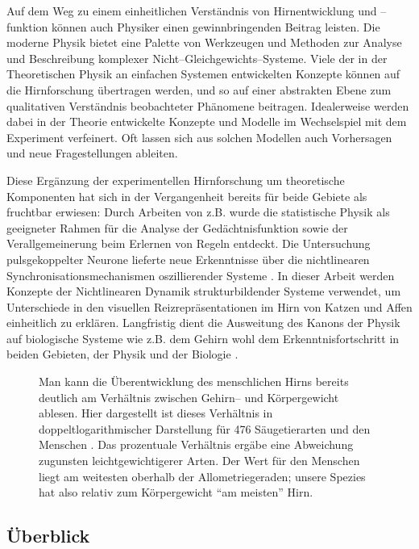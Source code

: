 Auf dem Weg zu einem einheitlichen Verständnis von Hirnentwicklung und
\mbox{--funktion} können auch Physiker einen gewinnbringenden Beitrag leisten.
Die moderne Physik bietet eine Palette von Werkzeugen und Methoden zur
Analyse und Beschreibung komplexer Nicht--Gleichgewichts--Systeme.  Viele
der in der Theoretischen Physik an einfachen Systemen entwickelten Konzepte
können auf die Hirnforschung übertragen werden, und so auf einer
abstrakten Ebene zum qualitativen Verständnis beobachteter Phänomene
beitragen. Idealerweise werden dabei in der Theorie entwickelte Konzepte
und Modelle im Wechselspiel mit dem Experiment verfeinert. Oft lassen sich
aus solchen Modellen auch Vorhersagen und neue Fragestellungen ableiten.

Diese Ergänzung der experimentellen Hirnforschung um theoretische
Komponenten hat sich in der Vergangenheit bereits für beide Gebiete als
fruchtbar erwiesen: Durch Arbeiten von 
z.B. wurde die statistische Physik als geeigneter Rahmen für die Analyse
der Gedächtnisfunktion sowie der Verallgemeinerung beim Erlernen von
Regeln entdeckt.  Die Untersuchung pulsgekoppelter Neurone lieferte neue
Erkenntnisse über die nichtlinearen Synchronisationsmechanismen
oszillierender Systeme .  In dieser
Arbeit werden Konzepte der Nichtlinearen Dynamik strukturbildender Systeme
verwendet, um Unterschiede in den visuellen Reizrepräsentationen im Hirn
von Katzen und Affen einheitlich zu erklären.  Langfristig dient die
Ausweitung des Kanons der Physik auf biologische Systeme wie z.B. dem
Gehirn wohl dem Erkenntnisfortschritt in beiden Gebieten, der Physik und
der Biologie \cite{braitenberg:1977}.

\begin{figure}[t]
\centering
{}
\caption{Man kann die Überentwicklung des menschlichen Hirns bereits
deutlich am Verhältnis zwischen Gehirn-- und Körpergewicht ablesen. Hier
dargestellt ist dieses Verhältnis in doppeltlogarithmischer Darstellung
für 476 Säugetierarten und den Menschen
\protect{}. Das prozentuale Verhältnis ergäbe
eine Abweichung zugunsten leichtgewichtigerer Arten.  Der Wert für den
Menschen liegt am weitesten oberhalb der Allometriegeraden; unsere Spezies
hat also relativ zum Körpergewicht ``am meisten'' Hirn.}
\label{hirnmasse}
\end{figure}

\subsection{Überblick}

